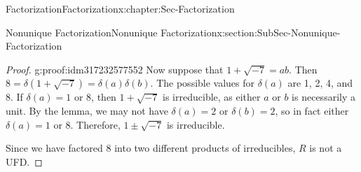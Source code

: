 \documentclass[oneside,10pt,]{book}
\numberwithin{equation}{section}
\begin{document}
\begin{chapterptx}{Factorization}{}{Factorization}{}{}{x:chapter:Sec-Factorization}
\begin{sectionptx}{Nonunique Factorization}{}{Nonunique Factorization}{}{}{x:section:SubSec-Nonunique-Factorization}
\begin{proof}{}{g:proof:idm317232577552}
Now suppose that \(1 + \sqrt{-7} = ab\). Then \(8 = \delta(1+\sqrt{-7}) = \delta(a) \delta(b)\). The possible values for \(\delta(a)\) are 1, 2, 4, and 8. If \(\delta(a) = 1\) or 8, then \(1+\sqrt{-7}\) is irreducible, as either \(a\) or \(b\) is necessarily a unit. By the lemma, we may not have \(\delta(a) = 2\) or \(\delta(b) = 2\), so in fact either \(\delta(a) = 1\) or 8. Therefore, \(1\pm \sqrt{-7}\) is irreducible.%
\par
Since we have factored 8 into two different products of irreducibles, \(R\) is not a UFD.%
\end{proof}
\end{sectionptx}
\end{chapterptx}
%
%
\typeout{************************************************}
\typeout{************************************************}
%
\end{document}

